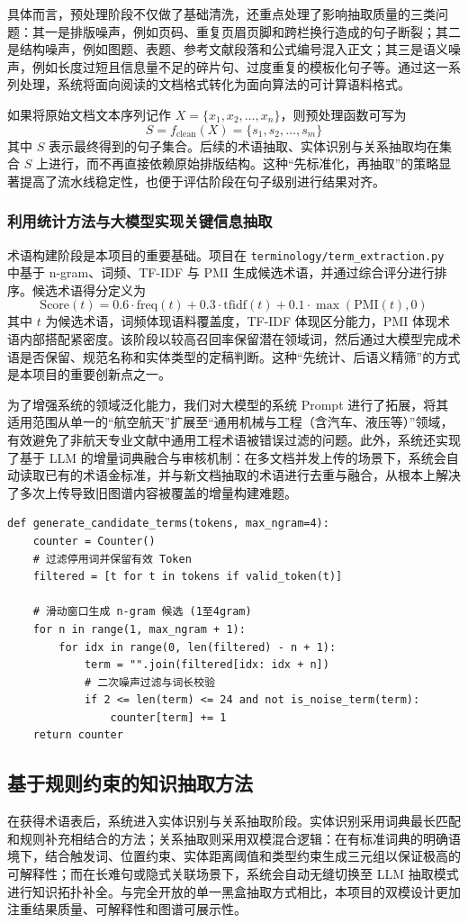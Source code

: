 具体而言，预处理阶段不仅做了基础清洗，还重点处理了影响抽取质量的三类问题：其一是排版噪声，例如页码、重复页眉页脚和跨栏换行造成的句子断裂；其二是结构噪声，例如图题、表题、参考文献段落和公式编号混入正文；其三是语义噪声，例如长度过短且信息量不足的碎片句、过度重复的模板化句子等。通过这一系列处理，系统将面向阅读的文档格式转化为面向算法的可计算语料格式。

如果将原始文档文本序列记作 \(X=\{x_1,x_2,\ldots,x_n\}\)，则预处理函数可写为
\[
S=f_{\mathrm{clean}}(X)=\{s_1,s_2,\ldots,s_m\}
\]
其中 \(S\) 表示最终得到的句子集合。后续的术语抽取、实体识别与关系抽取均在集合 \(S\) 上进行，而不再直接依赖原始排版结构。这种“先标准化，再抽取”的策略显著提高了流水线稳定性，也便于评估阶段在句子级别进行结果对齐。

\subsubsection{利用统计方法与大模型实现关键信息抽取}
术语构建阶段是本项目的重要基础。项目在 \texttt{terminology/term\_extraction.py} 中基于 n-gram、词频、TF-IDF 与 PMI 生成候选术语，并通过综合评分进行排序。候选术语得分定义为
\[
\mathrm{Score}(t)=0.6\cdot \mathrm{freq}(t)+0.3\cdot \mathrm{tfidf}(t)+0.1\cdot \max(\mathrm{PMI}(t),0)
\]
其中 \(t\) 为候选术语，词频体现语料覆盖度，TF-IDF 体现区分能力，PMI 体现术语内部搭配紧密度。该阶段以较高召回率保留潜在领域词，然后通过大模型完成术语是否保留、规范名称和实体类型的定稿判断。这种“先统计、后语义精筛”的方式是本项目的重要创新点之一。

为了增强系统的领域泛化能力，我们对大模型的系统 Prompt 进行了拓展，将其适用范围从单一的“航空航天”扩展至“通用机械与工程（含汽车、液压等）”领域，有效避免了非航天专业文献中通用工程术语被错误过滤的问题。此外，系统还实现了基于 LLM 的增量词典融合与审核机制：在多文档并发上传的场景下，系统会自动读取已有的术语金标准，并与新文档抽取的术语进行去重与融合，从根本上解决了多次上传导致旧图谱内容被覆盖的增量构建难题。


\begin{lstlisting}[style=pythonstyle,caption={候选术语生成示意}]
def generate_candidate_terms(tokens, max_ngram=4):
    counter = Counter()
    # 过滤停用词并保留有效 Token
    filtered = [t for t in tokens if valid_token(t)]

    # 滑动窗口生成 n-gram 候选 (1至4gram)
    for n in range(1, max_ngram + 1):
        for idx in range(0, len(filtered) - n + 1):
            term = "".join(filtered[idx: idx + n])
            # 二次噪声过滤与词长校验
            if 2 <= len(term) <= 24 and not is_noise_term(term):
                counter[term] += 1
    return counter
\end{lstlisting}

\subsection{基于规则约束的知识抽取方法}
在获得术语表后，系统进入实体识别与关系抽取阶段。实体识别采用词典最长匹配和规则补充相结合的方法；关系抽取则采用双模混合逻辑：在有标准词典的明确语境下，结合触发词、位置约束、实体距离阈值和类型约束生成三元组以保证极高的可解释性；而在长难句或隐式关联场景下，系统会自动无缝切换至 LLM 抽取模式进行知识拓扑补全。与完全开放的单一黑盒抽取方式相比，本项目的双模设计更加注重结果质量、可解释性和图谱可展示性。
